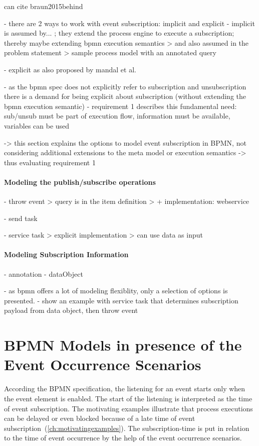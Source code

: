 can cite braun2015behind

- there are 2 ways to work with event subscription: implicit and explicit
- implicit is assumed by... ; they extend the process engine to execute a subscription; thereby maybe extending bpmn execution semantics
	> and also assumed in the problem statement
	> sample process model with an annotated query
	
- explicit as also proposed by mandal et al.

- as the bpmn spec does not explicitly refer to subscription and unsubscription there is a demand for being explicit about subscription (without extending the bpmn execution semantic)
- requirement 1 describes this fundamental need: sub/unsub must be part of execution flow, information must be available, variables can be used

-> this section explains the options to model event subscription in BPMN, not considering additional extensions to the meta model or execution semantics
-> thus evaluating requirement 1

\paragraph{Modeling the publish/subscribe operations}

- throw event
	> query is in the item definition
	> + implementation: webservice

- send task

- service task
	> explicit implementation
	> can use data as input

\paragraph{Modeling Subscription Information}
- annotation
- dataObject


- as bpmn offers a lot of modeling flexiblity, only a selection of options is presented.
- show an example with service task that determines subscription payload from data object, then throw event



\section{BPMN Models in presence of the Event Occurrence Scenarios}\label{ch:ass:models}
According the BPMN specification, the listening for an event starts only when the event element is enabled. The start of the listening is interpreted as the time of event subscription.
The motivating examples illustrate that process executions can be delayed or even blocked because of a late time of event subscription~(\autoref{ch:motivatingexamples}).
The subscription-time is put in relation to the time of event occurrence by the help of the event occurrence scenarios.

